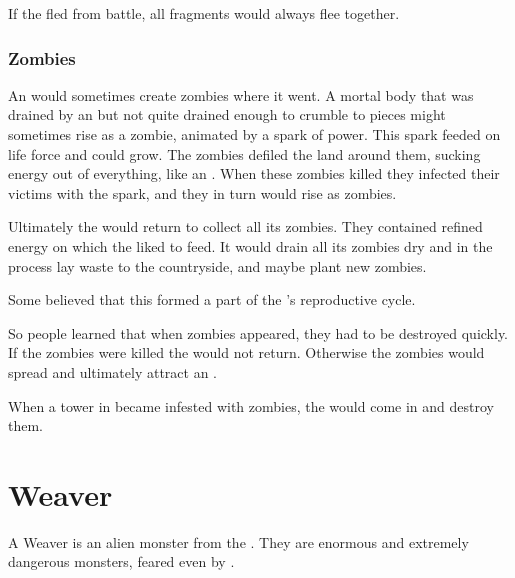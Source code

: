If the \umbra fled from battle, all fragments would always flee together. 





\subsubsection{Zombies}
An \umbra would sometimes create zombies where it went. 
A mortal body that was drained by an \umbra but not quite drained enough to crumble to pieces might sometimes rise as a zombie, animated by a spark of \umbra power. 
This \umbra spark feeded on life force and could grow. 
The zombies defiled the land around them, sucking energy out of everything, like an \umbra.
When these zombies killed they infected their victims with the \umbra spark, and they in turn would rise as zombies.

Ultimately the \umbra would return to collect all its zombies. 
They contained refined \umbra energy on which the \umbra liked to feed.
It would drain all its zombies dry and in the process lay waste to the countryside, and maybe plant new zombies. 

Some believed that this formed a part of the \umbrae's reproductive cycle.

So people learned that when \umbra zombies appeared, they had to be destroyed quickly. 
If the zombies were killed the \umbra would not return. 
Otherwise the zombies would spread and ultimately attract an \umbra.

When a tower in \Nyx became infested with zombies, the  would come in and destroy them.















\section{Weaver}

A Weaver is an alien monster from the \baneworld. They are enormous and extremely dangerous monsters, feared even by \dragons{}. 


